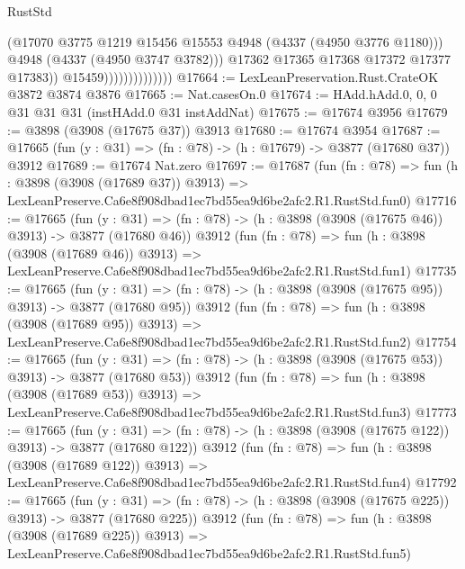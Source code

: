 \begin{lexlean}{RustStd}
\begin{coremodule}
                                      (@17070
                                        @3775
                                        @1219
                                        @15456
                                        @15553
                                        @4948
                                        (@4337 (@4950 @3776 @1180)))
                                      @4948
                                      (@4337 (@4950 @3747 @3782)))
                                    @17362
                                    @17365
                                    @17368
                                    @17372
                                    @17377
                                    @17383))
                                @15459))))))))))))))
@17664 := LexLeanPreservation.Rust.CrateOK @3872 @3874 @3876
@17665 := Nat.casesOn.{0}
@17674 := HAdd.hAdd.{0, 0, 0} @31 @31 @31 (instHAdd.{0} @31 instAddNat)
@17675 := @17674 @3956
@17679 := @3898 (@3908 (@17675 @37)) @3913
@17680 := @17674 @3954
@17687 := @17665 (fun (y : @31) => (fn : @78) -> (h : @17679) -> @3877 (@17680 @37)) @3912
@17689 := @17674 Nat.zero
@17697 := @17687
    (fun (fn : @78) =>
    fun (h : @3898 (@3908 (@17689 @37)) @3913) =>
    LexLeanPreserve.Ca6e8f908dbad1ec7bd55ea9d6be2afc2.R1.RustStd.fun0)
@17716 := @17665
    (fun (y : @31) => (fn : @78) -> (h : @3898 (@3908 (@17675 @46)) @3913) -> @3877 (@17680 @46))
    @3912
    (fun (fn : @78) =>
    fun (h : @3898 (@3908 (@17689 @46)) @3913) =>
    LexLeanPreserve.Ca6e8f908dbad1ec7bd55ea9d6be2afc2.R1.RustStd.fun1)
@17735 := @17665
    (fun (y : @31) => (fn : @78) -> (h : @3898 (@3908 (@17675 @95)) @3913) -> @3877 (@17680 @95))
    @3912
    (fun (fn : @78) =>
    fun (h : @3898 (@3908 (@17689 @95)) @3913) =>
    LexLeanPreserve.Ca6e8f908dbad1ec7bd55ea9d6be2afc2.R1.RustStd.fun2)
@17754 := @17665
    (fun (y : @31) => (fn : @78) -> (h : @3898 (@3908 (@17675 @53)) @3913) -> @3877 (@17680 @53))
    @3912
    (fun (fn : @78) =>
    fun (h : @3898 (@3908 (@17689 @53)) @3913) =>
    LexLeanPreserve.Ca6e8f908dbad1ec7bd55ea9d6be2afc2.R1.RustStd.fun3)
@17773 := @17665
    (fun (y : @31) => (fn : @78) -> (h : @3898 (@3908 (@17675 @122)) @3913) -> @3877 (@17680 @122))
    @3912
    (fun (fn : @78) =>
    fun (h : @3898 (@3908 (@17689 @122)) @3913) =>
    LexLeanPreserve.Ca6e8f908dbad1ec7bd55ea9d6be2afc2.R1.RustStd.fun4)
@17792 := @17665
    (fun (y : @31) => (fn : @78) -> (h : @3898 (@3908 (@17675 @225)) @3913) -> @3877 (@17680 @225))
    @3912
    (fun (fn : @78) =>
    fun (h : @3898 (@3908 (@17689 @225)) @3913) =>
    LexLeanPreserve.Ca6e8f908dbad1ec7bd55ea9d6be2afc2.R1.RustStd.fun5)

\end{coremodule}
\end{lexlean}
